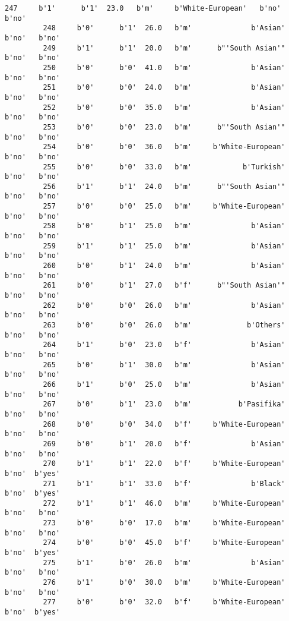 \documentclass[11pt]{article}
\begin{document}
\begin{Verbatim}[commandchars=\\\{\}]
         247     b'1'      b'1'  23.0   b'm'     b'White-European'   b'no'   b'no'   
         248     b'0'      b'1'  26.0   b'm'              b'Asian'   b'no'   b'no'   
         249     b'1'      b'1'  20.0   b'm'      b"'South Asian'"   b'no'   b'no'   
         250     b'0'      b'0'  41.0   b'm'              b'Asian'   b'no'   b'no'   
         251     b'0'      b'0'  24.0   b'm'              b'Asian'   b'no'   b'no'   
         252     b'0'      b'0'  35.0   b'm'              b'Asian'   b'no'   b'no'   
         253     b'0'      b'0'  23.0   b'm'      b"'South Asian'"   b'no'   b'no'   
         254     b'0'      b'0'  36.0   b'm'     b'White-European'   b'no'   b'no'   
         255     b'0'      b'0'  33.0   b'm'            b'Turkish'   b'no'   b'no'   
         256     b'1'      b'1'  24.0   b'm'      b"'South Asian'"   b'no'   b'no'   
         257     b'0'      b'0'  25.0   b'm'     b'White-European'   b'no'   b'no'   
         258     b'0'      b'1'  25.0   b'm'              b'Asian'   b'no'   b'no'   
         259     b'1'      b'1'  25.0   b'm'              b'Asian'   b'no'   b'no'   
         260     b'0'      b'1'  24.0   b'm'              b'Asian'   b'no'   b'no'   
         261     b'0'      b'1'  27.0   b'f'      b"'South Asian'"   b'no'   b'no'   
         262     b'0'      b'0'  26.0   b'm'              b'Asian'   b'no'   b'no'   
         263     b'0'      b'0'  26.0   b'm'             b'Others'   b'no'   b'no'   
         264     b'1'      b'0'  23.0   b'f'              b'Asian'   b'no'   b'no'   
         265     b'0'      b'1'  30.0   b'm'              b'Asian'   b'no'   b'no'   
         266     b'1'      b'0'  25.0   b'm'              b'Asian'   b'no'   b'no'   
         267     b'0'      b'1'  23.0   b'm'           b'Pasifika'   b'no'   b'no'   
         268     b'0'      b'0'  34.0   b'f'     b'White-European'   b'no'   b'no'   
         269     b'0'      b'1'  20.0   b'f'              b'Asian'   b'no'   b'no'   
         270     b'1'      b'1'  22.0   b'f'     b'White-European'   b'no'  b'yes'   
         271     b'1'      b'1'  33.0   b'f'              b'Black'   b'no'  b'yes'   
         272     b'1'      b'1'  46.0   b'm'     b'White-European'   b'no'   b'no'   
         273     b'0'      b'0'  17.0   b'm'     b'White-European'   b'no'   b'no'   
         274     b'0'      b'0'  45.0   b'f'     b'White-European'   b'no'  b'yes'   
         275     b'1'      b'0'  26.0   b'm'              b'Asian'   b'no'   b'no'   
         276     b'1'      b'0'  30.0   b'm'     b'White-European'   b'no'   b'no'   
         277     b'0'      b'0'  32.0   b'f'     b'White-European'   b'no'  b'yes'   

\end{Verbatim}
\end{document}
